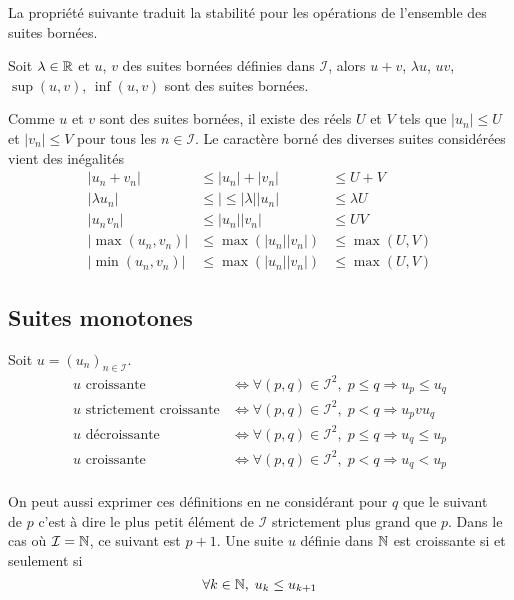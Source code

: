 La propriété suivante traduit la stabilité pour les opérations de l'ensemble des suites bornées.
\begin{prop}\label{opbornes}
  Soit $\lambda\in \mathbb{R}$ et $u$, $v$ des suites bornées définies dans $\mathcal{I}$, alors $u+v$, $\lambda u$, $uv$, $\sup(u,v)$, $\inf(u,v)$ sont des suites bornées. 
\end{prop}
\begin{demo}
  Comme $u$ et $v$ sont des suites bornées, il existe des réels $U$ et $V$ tels que $|u_n|\leq U$ et $|v_n|\leq V$ pour tous les $n\in \mathcal{I}$. Le caractère borné des diverses suites considérées vient des inégalités
\begin{align*}
  |u_n + v_n|&\leq |u_n| + |v_n| &\leq U + V \\
  |\lambda u_n|&\leq |\leq |\lambda| |u_n| &\leq \lambda U \\
  |u_n v_n|&\leq |u_n| |v_n| &\leq UV \\
  |\max(u_n, v_n)|&\leq \max(|u_n| |v_n|) &\leq \max(U,V) \\
  |\min(u_n, v_n)|&\leq \max(|u_n| |v_n|) &\leq \max(U,V)
\end{align*}
\end{demo}


\subsection{Suites monotones}
\begin{defi}
Soit $u=(u_n)_{n \in \mathcal{I}}$.
\begin{align*}
  u \text{ croissante} &\Leftrightarrow \forall (p,q)\in \mathcal{I}^2, \; p\leq q \Rightarrow u_p \leq u_q \\
  u \text{ strictement croissante} &\Leftrightarrow \forall (p,q)\in \mathcal{I}^2, \; p < q \Rightarrow u_p v u_q \\
  u \text{ décroissante} &\Leftrightarrow \forall (p,q)\in \mathcal{I}^2, \; p\leq q \Rightarrow u_q \leq u_p \\
  u \text{ croissante} &\Leftrightarrow \forall (p,q)\in \mathcal{I}^2, \; p < q \Rightarrow u_q < u_p \\
\end{align*}
\end{defi}
On peut aussi exprimer ces définitions en ne considérant pour $q$ que le \og suivant\fg~ de $p$ c'est à dire le plus petit élément de $\mathcal{I}$ strictement plus grand que $p$. Dans le cas où $\mathcal{I}=\mathbb{N}$, ce suivant est $p+1$. Une suite $u$ définie dans $\mathbb{N}$ est croissante si et seulement si
\begin{displaymath}
  \forall k\in \mathbb{N}, \; u_k \leq u_{k+1}
\end{displaymath}

